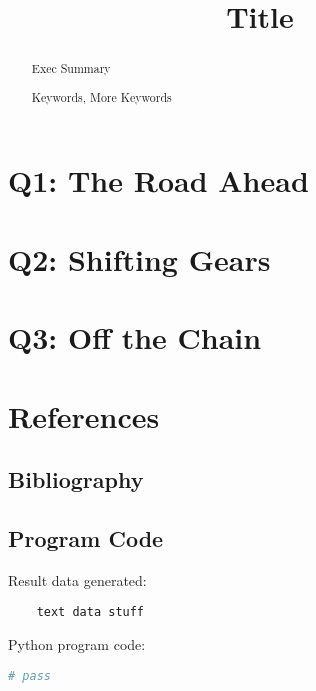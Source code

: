\documentclass{mcm}
\title{Title}
\numberwithin{figure}{section}
\numberwithin{table}{section}
\numberwithin{equation}{section}
\begin{document}
    \begin{abstract}
        Exec Summary

        \begin{keywords}
            Keywords, More Keywords
        \end{keywords}

    \end{abstract}

    \maketitle
    \tableofcontents
    \newpage


    \section{Q1: The Road Ahead}
    

    \section{Q2: Shifting Gears}
    

    \section{Q3: Off the Chain}
    

    \section{References}

    \subsection{Bibliography}
    \printbibliography

    \subsection{Program Code}
    \noindent Result data generated:
    \begin{verbatim}
    text data stuff

    \end{verbatim}

    \noindent Python program code:
    \begin{lstlisting}[language=Python,label={lst:code}]
        # pass

    \end{lstlisting}
\end{document}
